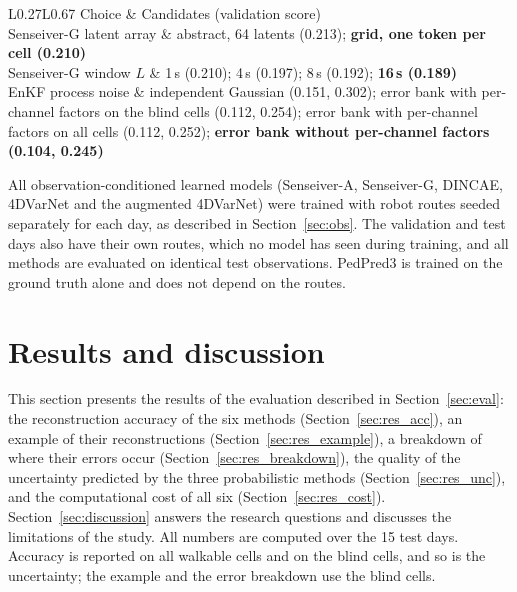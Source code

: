 \documentclass[english, 12pt, a4paper, elec, utf8, a-2b, online]{aaltothesis}
\begin{document}
\begin{table}[htb]
	\centering
	\caption{Design choices made on the seven validation Sundays of the
	Sunday-only development, one seed per candidate (Senseiver candidates trained
	for 40 epochs). Scores: pooled RMSE on the blind walkable cells; for the EnKF,
	the CRPS of the Gaussian summary of the ensemble, followed by its RMSE.
	Per-channel factors are additional per-channel multipliers of the process
	noise. The selected design is in bold.}
	\label{tab:selection}
	\small
	\setlength{\tabcolsep}{4pt}
	\begin{tabular}{L{0.27\textwidth}L{0.67\textwidth}}
		\hline
		Choice & Candidates (validation score) \\
		\hline
		Senseiver\nobreakdash-G latent array & abstract, 64 latents (0.213); \textbf{grid, one token per cell (0.210)} \\
		Senseiver\nobreakdash-G window $L$ & 1\,s (0.210); 4\,s (0.197); 8\,s (0.192); \textbf{16\,s (0.189)} \\
		EnKF process noise & independent Gaussian (0.151, 0.302); error bank with per-channel factors on the blind cells (0.112, 0.254); error bank with per-channel factors on all cells (0.112, 0.252); \textbf{error bank without per-channel factors (0.104, 0.245)} \\
		\hline
	\end{tabular}
\end{table}

All observation-conditioned learned models (Senseiver\nobreakdash-A, Senseiver\nobreakdash-G,
DINCAE, 4DVarNet and the augmented 4DVarNet) were trained with
robot routes seeded separately for each day, as described in
Section~\ref{sec:obs}. The validation and test days also have their own
routes, which no model has seen during training, and all methods are evaluated
on identical test observations. PedPred3 is trained on the ground truth alone
and does not depend on the routes.

\clearpage

\section{Results and discussion}
\label{sec:results}

This section presents the results of the evaluation described in
Section~\ref{sec:eval}: the reconstruction accuracy of the six methods
(Section~\ref{sec:res_acc}), an example of their reconstructions
(Section~\ref{sec:res_example}), a breakdown of where their errors occur
(Section~\ref{sec:res_breakdown}), the quality of the uncertainty predicted by the
three probabilistic methods (Section~\ref{sec:res_unc}), and the computational
cost of all six (Section~\ref{sec:res_cost}). Section~\ref{sec:discussion}
answers the research questions and discusses the limitations of the study. All
numbers are computed over the 15 test days. Accuracy is reported on all
walkable cells and on the blind cells, and so is the uncertainty; the example
and the error breakdown use the blind cells.
\end{document}
